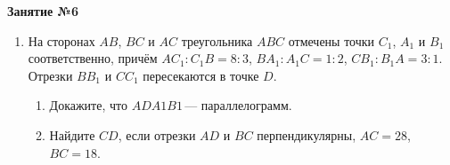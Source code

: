 \documentclass[12pt, a4paper]{article}
\begin{document}
	
	\begin{center}
		\Large
		\textbf{Занятие №6}
	\end{center}
	\begin{enumerate}
		\item На сторонах \( AB \), \( BC \) и \( AC \) треугольника \( ABC \) отмечены точки \( C_1 \), \( A_1 \) и \( B_1 \) соответственно, причём \( AC_1 : C_1B = 8 : 3 \), \( BA_1 : A_1C = 1 : 2 \), \( CB_1 : B_1A = 3 : 1 \). Отрезки \( BB_1 \) и \( CC_1 \) пересекаются в точке \( D \).
		\begin{enumerate}[label=\asbuk*)]
			\item Докажите, что \( ADA1B1 \) — параллелограмм.
			\item Найдите \( CD \), если отрезки \( AD \) и \( BC \) перпендикулярны, \( AC = 28 \), \( BC = 18 \).
		\end{enumerate}
	\end{enumerate}
\end{document}
